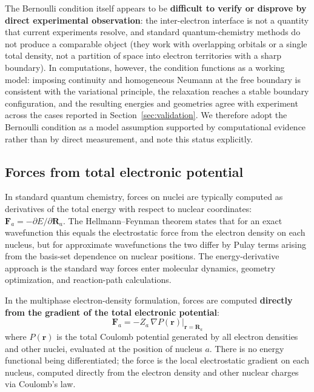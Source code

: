 \documentclass[11pt]{article}
\begin{document}
The Bernoulli condition itself appears to be \textbf{difficult to verify or disprove by direct experimental observation}: the inter-electron interface is not a quantity that current experiments resolve, and standard quantum-chemistry methods do not produce a comparable object (they work with overlapping orbitals or a single total density, not a partition of space into electron territories with a sharp boundary). In computations, however, the condition functions as a working model: imposing continuity and homogeneous Neumann at the free boundary is consistent with the variational principle, the relaxation reaches a stable boundary configuration, and the resulting energies and geometries agree with experiment across the cases reported in Section~\ref{sec:validation}. We therefore adopt the Bernoulli condition as a model assumption supported by computational evidence rather than by direct measurement, and note this status explicitly.

\subsection{Forces from total electronic potential}\label{sec:forces}

In standard quantum chemistry, forces on nuclei are typically computed as derivatives of the total energy with respect to nuclear coordinates: $\mathbf{F}_a = -\partial E / \partial \mathbf{R}_a$. The Hellmann--Feynman theorem states that for an exact wavefunction this equals the electrostatic force from the electron density on each nucleus, but for approximate wavefunctions the two differ by Pulay terms arising from the basis-set dependence on nuclear positions. The energy-derivative approach is the standard way forces enter molecular dynamics, geometry optimization, and reaction-path calculations.

In the multiphase electron-density formulation, forces are computed \textbf{directly from the gradient of the total electronic potential}:
\begin{equation}
\mathbf{F}_a = -Z_a \, \nabla P(\mathbf{r}) \big|_{\mathbf{r} = \mathbf{R}_a}
\end{equation}
where $P(\mathbf{r})$ is the total Coulomb potential generated by all electron densities and other nuclei, evaluated at the position of nucleus $a$. There is no energy functional being differentiated; the force is the local electrostatic gradient on each nucleus, computed directly from the electron density and other nuclear charges via Coulomb's law.
\end{document}
